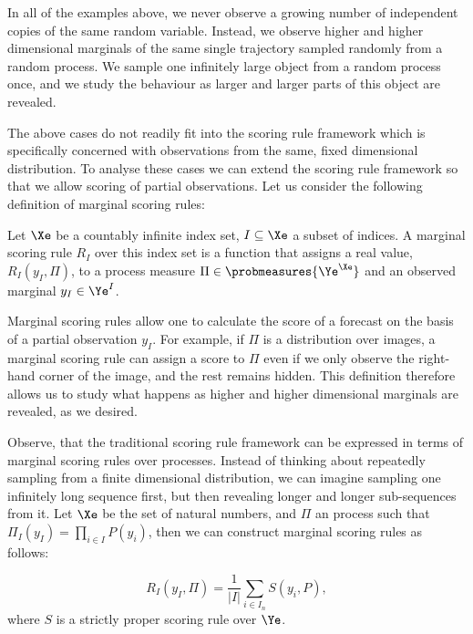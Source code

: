 In all of the examples above, we never observe a growing number of independent copies of the same random variable. Instead, we observe higher and higher dimensional marginals of the same single trajectory sampled randomly from a random process. We sample one infinitely large object from a random process once, and we study the behaviour as larger and larger parts of this object are revealed.

The above cases do not readily fit into the scoring rule framework which is specifically concerned with \iid observations from the same, fixed dimensional distribution. To analyse these cases we can extend the scoring rule framework so that we allow scoring of partial observations. Let us consider the following definition of marginal scoring rules:

\begin{definition}
Let $\Xe$ be a countably infinite index set, $I\subseteq\Xe$ a subset of indices. A marginal scoring rule $R_I$ over this index set is a function that assigns a real value, $R_{I}(y_{I},\Pi)$,  to a process measure $\Pi\in\probmeasures{\Ye^{\Xe}}$ and an observed marginal $y_{I}\in\Ye^{I}$.
\end{definition}

Marginal scoring rules allow one to calculate the score of a forecast on the basis of a partial observation $y_{I}$. For example, if $\Pi$ is a distribution over images, a marginal scoring rule can assign a score to $\Pi$ even if we only observe the right-hand corner of the image, and the rest remains hidden. This definition therefore allows us to study what happens as higher and higher dimensional marginals are revealed, as we desired.

Observe, that the traditional \iid scoring rule framework can be expressed in terms of marginal scoring rules over \iid processes. Instead of thinking about repeatedly sampling from a finite dimensional distribution, we can imagine sampling one infinitely long sequence first, but then revealing longer and longer sub-sequences from it. Let $\Xe$ be the set of natural numbers, and $\Pi$ an \iid process such that $\Pi_{I}(y_{I}) = \prod_{i\in I} P(y_i)$, then we can construct marginal scoring rules as follows:

\begin{equation}
R_{I}(y_{I},\Pi) = \frac{1}{\vert I \vert} \sum_{i\in I_n} S(y_i,P)\label{Eqn:decompose},
\end{equation}
where $S$ is a strictly proper scoring rule over $\Ye$.

